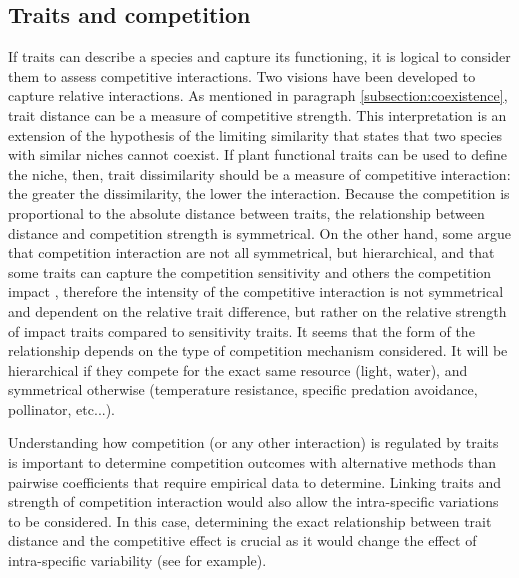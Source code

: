 \subsection{Traits and competition}

If traits can describe a species and capture its functioning, it is logical to consider them to assess competitive interactions. Two visions have been developed to capture relative interactions. As mentioned in paragraph \ref{subsection:coexistence}, trait distance can be a measure of competitive strength. This interpretation is an extension of the hypothesis of the limiting similarity that states that two species with similar niches cannot coexist. If plant functional traits can be used to define the niche, then, trait dissimilarity should be a measure of competitive interaction: the greater the dissimilarity, the lower the interaction. Because the competition is proportional to the absolute distance between traits, the relationship between distance and competition strength is symmetrical. On the other hand, some argue that competition interaction are not all symmetrical, but hierarchical, and that some traits can capture the competition sensitivity and others the competition impact \parencite{kunstler_plant_2016}, therefore the intensity of the competitive interaction is not symmetrical and dependent on the relative trait difference, but rather on the relative strength of impact traits compared to sensitivity traits. It seems that the form of the relationship depends on the type of competition mechanism considered. It will be hierarchical if they compete for the exact same resource (light, water), and symmetrical otherwise (temperature resistance, specific predation avoidance, pollinator, etc...).

Understanding how competition (or any other interaction) is regulated by traits is important to determine competition outcomes with alternative methods than pairwise coefficients that require empirical data to determine. Linking traits and strength of competition interaction would also allow the intra-specific variations to be considered. In this case, determining the exact relationship between trait distance and the competitive effect is crucial as it would change the effect of intra-specific variability (see \cite{hart_how_2016} for example).

